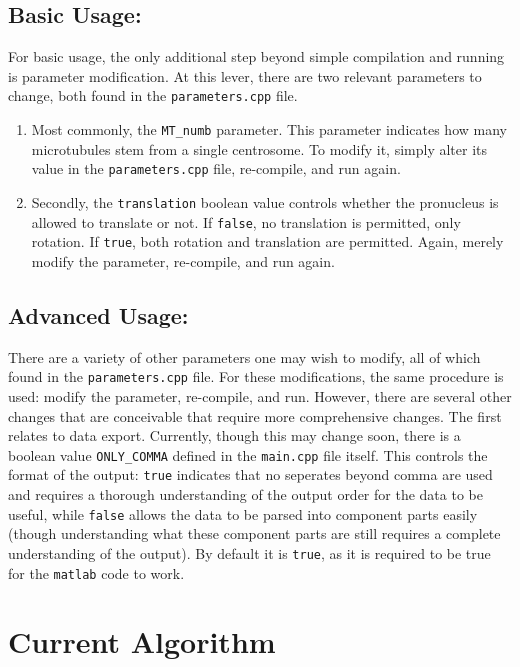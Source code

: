 \documentclass{article}
\begin{document}
  \subsection{Basic Usage:}
  For basic usage, the only additional step beyond simple compilation and
  running is parameter modification. At this lever, there are two relevant
  parameters to change, both found in the \texttt{parameters.cpp} file.
  \begin{enumerate}
    \item Most commonly, the \texttt{MT\_numb} parameter. This parameter
      indicates how many microtubules stem from a single centrosome. To modify
      it, simply alter its value in the \texttt{parameters.cpp} file,
      re-compile, and run again.  
    \item Secondly, the \texttt{translation} boolean value controls whether the
      pronucleus is allowed to translate or not. If \texttt{false}, no
      translation is permitted, only rotation. If \texttt{true}, both rotation
      and translation are permitted. Again, merely modify the parameter,
      re-compile, and run again. 
  \end{enumerate}
  \subsection{Advanced Usage:}
  There are a variety of other parameters one may wish to modify, all of which
  found in the \texttt{parameters.cpp} file. For these modifications, the same
  procedure is used: modify the parameter, re-compile, and run. However, there
  are several other changes that are conceivable that require more comprehensive
  changes. The first relates to data export. Currently, though this may change
  soon, there is a boolean value \texttt{ONLY\_COMMA} defined in the
  \texttt{main.cpp} file itself. This controls the format of the output:
  \texttt{true} indicates that no seperates beyond comma are used and requires a
  thorough understanding of the output order for the data to be useful, while
  \texttt{false} allows the data to be parsed into component parts easily
  (though understanding what these component parts are still requires a complete
  understanding of the output). By default it is \texttt{true}, as it is
  required to be true for the \texttt{matlab} code to work. 
\section{Current Algorithm}
\end{document}
